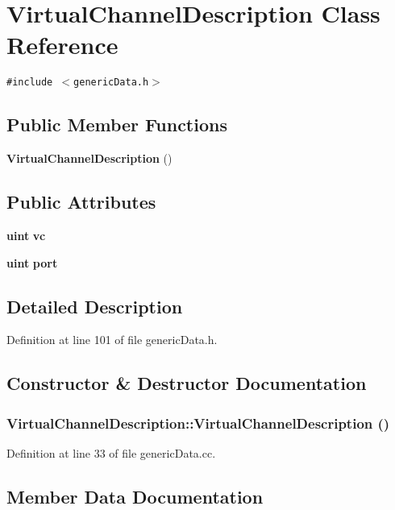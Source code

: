 \section{VirtualChannelDescription Class Reference}
\label{classVirtualChannelDescription}
{\tt \#include $<$genericData.h$>$}

\subsection*{Public Member Functions}
\begin{CompactItemize}
\item 
{\bf VirtualChannelDescription} ()
\end{CompactItemize}
\subsection*{Public Attributes}
\begin{CompactItemize}
\item 
{\bf uint} {\bf vc}
\item 
{\bf uint} {\bf port}
\end{CompactItemize}


\subsection{Detailed Description}


Definition at line 101 of file genericData.h.

\subsection{Constructor \& Destructor Documentation}
\subsubsection[{VirtualChannelDescription}]{\setlength{\rightskip}{0pt plus 5cm}VirtualChannelDescription::VirtualChannelDescription ()}\label{classVirtualChannelDescription_289d22640be56f23605294589d924607}




Definition at line 33 of file genericData.cc.

\subsection{Member Data Documentation}
